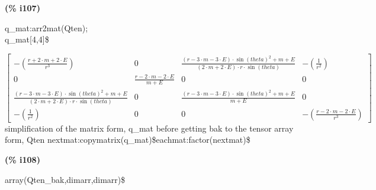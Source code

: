 \documentclass[fleqn]{article}
\begin{document}
\noindent
\begin{minipage}[t]{4.000000em}\color{red}\bfseries
(\% i107)	
\end{minipage}
\begin{minipage}[t]{\textwidth}\color{blue}
q\_mat:arr2mat(Qten);\\
q\_mat[4,4]\$
\end{minipage}
\[\displaystyle \tag{\% o106} 
\begin{bmatrix}\mathop{-}\left( \frac{r\mathop{+}2\mathop{\ensuremath{\cdot}}m\mathop{+}2\mathop{\ensuremath{\cdot}}E}{{{r}^{3}}}\right)  & 0 & \frac{\left( r\mathop{-}3\mathop{\ensuremath{\cdot}}m\mathop{-}3\mathop{\ensuremath{\cdot}}E\right) \mathop{\ensuremath{\cdot}}{{\sin{(theta)}}^{2}}\mathop{+}m\mathop{+}E}{\left( 2\mathop{\ensuremath{\cdot}}m\mathop{+}2\mathop{\ensuremath{\cdot}}E\right) \mathop{\ensuremath{\cdot}}r\mathop{\ensuremath{\cdot}}\sin{(theta)}} & \mathop{-}\left( \frac{1}{{{r}^{2}}}\right) \\
0 & \frac{r\mathop{-}2\mathop{\ensuremath{\cdot}}m\mathop{-}2\mathop{\ensuremath{\cdot}}E}{m\mathop{+}E} & 0 & 0\\
\frac{\left( r\mathop{-}3\mathop{\ensuremath{\cdot}}m\mathop{-}3\mathop{\ensuremath{\cdot}}E\right) \mathop{\ensuremath{\cdot}}{{\sin{(theta)}}^{2}}\mathop{+}m\mathop{+}E}{\left( 2\mathop{\ensuremath{\cdot}}m\mathop{+}2\mathop{\ensuremath{\cdot}}E\right) \mathop{\ensuremath{\cdot}}r\mathop{\ensuremath{\cdot}}\sin{(theta)}} & 0 & \frac{\left( r\mathop{-}3\mathop{\ensuremath{\cdot}}m\mathop{-}3\mathop{\ensuremath{\cdot}}E\right) \mathop{\ensuremath{\cdot}}{{\sin{(theta)}}^{2}}\mathop{+}m\mathop{+}E}{m\mathop{+}E} & 0\\
\mathop{-}\left( \frac{1}{{{r}^{2}}}\right)  & 0 & 0 & \mathop{-}\left( \frac{r\mathop{-}2\mathop{\ensuremath{\cdot}}m\mathop{-}2\mathop{\ensuremath{\cdot}}E}{{{r}^{3}}}\right) \end{bmatrix}\mbox{}
\]
simplification of the matrix form, q\_mat before getting bak to the tensor array form, Qten
nextmat:copymatrix(q\_mat)\$eachmat:factor(nextmat)\$


\noindent
\begin{minipage}[t]{4.000000em}\color{red}\bfseries
(\% i108)	
\end{minipage}
\begin{minipage}[t]{\textwidth}\color{blue}
array(Qten\_bak,dimarr,dimarr)\$
\end{minipage}
\end{document}
